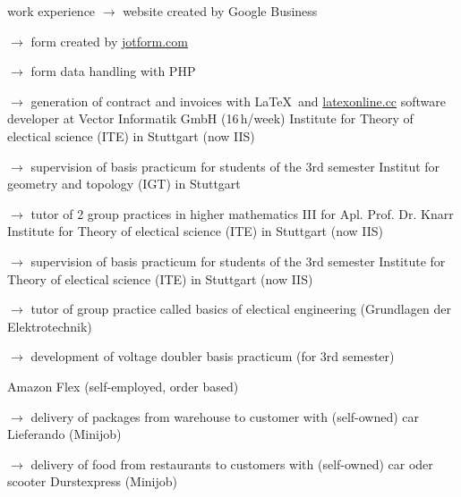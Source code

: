 \begin{rubric}{\textcolor{black!20!blue!100}{work experience}}
			\setlength{\hangindent}{\widthof{$\rightarrow$ }}
			$\rightarrow$ website created by Google Business

			$\rightarrow$ form created by \href{https://www.jotform.com/}{jotform.com}

			$\rightarrow$ form data handling with PHP

			$\rightarrow$ generation of contract and invoices with \LaTeX\ and \href{https://latexonline.cc/}{latexonline.cc}
%			
		\entry*[05/2016 --- 10/2017]
			software developer at Vector Informatik GmbH (16\,h/week)
		\entry*[10/2015 --- 03/2016]
			Institute for Theory of electical science (ITE) in Stuttgart (now IIS)
				
			\setlength{\hangindent}{\widthof{$\rightarrow$ }}
			$\rightarrow$ supervision of basis practicum for students of the 3rd semester
		\entry*
			Institut for geometry and topology (IGT) in Stuttgart
			
			\setlength{\hangindent}{\widthof{$\rightarrow$ }}
			$\rightarrow$ tutor of 2 group practices in higher mathematics III for Apl. Prof. Dr. Knarr
		\entry*[10/2014 --- 03/2015]
			Institute for Theory of electical science (ITE) in Stuttgart (now IIS)
			
			\setlength{\hangindent}{\widthof{$\rightarrow$ }}
			$\rightarrow$ supervision of basis practicum for students of the 3rd semester
		\entry*[10/2013 --- 03/2014]
			Institute for Theory of electical science (ITE) in Stuttgart (now IIS)
			
			\setlength{\hangindent}{\widthof{$\rightarrow$ }}
			$\rightarrow$ tutor of group practice called basics of electical engineering (\glqq Grundlagen der Elektrotechnik\grqq)
			
			$\rightarrow$ development of voltage doubler basis practicum (for 3rd semester)
	
		\entry*[since 09/11/2020]
			Amazon Flex (self-employed, order based)
			
			\setlength{\hangindent}{\widthof{$\rightarrow$ }}
			$\rightarrow$ delivery of packages from warehouse to customer with (self-owned) car
		\entry*[24/10/2020 --- 04/01/2021]
			Lieferando (Minijob)
			
			\setlength{\hangindent}{\widthof{$\rightarrow$ }}
			$\rightarrow$ delivery of food from restaurants to customers with (self-owned) car oder scooter
		\entry*[17/07/2020 --- 18/10/2020]
			Durstexpress (Minijob)
			

\end{rubric}
